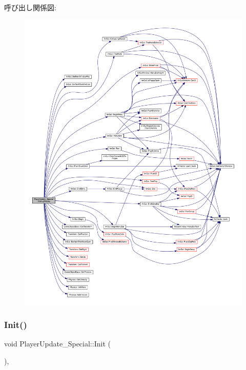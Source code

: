 呼び出し関係図\+:\nopagebreak
\begin{figure}[H]
\begin{center}
\leavevmode
\includegraphics[width=350pt]{class_player_update___special_a6253000b53b2c5bc73ce0ed4d3b4a82a_cgraph}
\end{center}
\end{figure}
\mbox{\label{class_player_update___special_a48906da6915325d92d5cc6ec67212259}} 
\subsubsection{\texorpdfstring{Init()}{Init()}}
{\footnotesize\ttfamily void Player\+Update\+\_\+\+Special\+::\+Init (\begin{DoxyParamCaption}{ }\end{DoxyParamCaption})\hspace{0.3cm}{\ttfamily [override]}, {\ttfamily [virtual]}}



